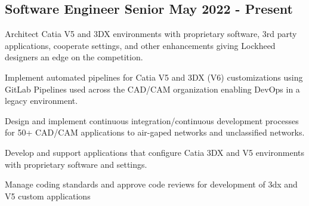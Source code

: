 \subsection{{Software Engineer Senior \hfill May 2022 - Present}}
\begin{zitemize}
	\item Architect Catia V5 and 3DX environments with proprietary software, 3rd party applications, cooperate settings, and other enhancements giving Lockheed designers an edge on the competition. 
	\item Implement automated pipelines for Catia V5 and 3DX (V6) customizations using GitLab Pipelines used across the CAD/CAM organization enabling DevOps in a legacy environment.
	\item Design and implement continuous integration/continuous development  processes for 50+ CAD/CAM applications to air-gaped networks and unclassified networks.
	\item Develop and support applications that configure Catia 3DX and V5 environments with proprietary software and settings.
	\item Manage coding standards and approve code reviews for development of 3dx and V5 custom applications\\
\end{zitemize}


